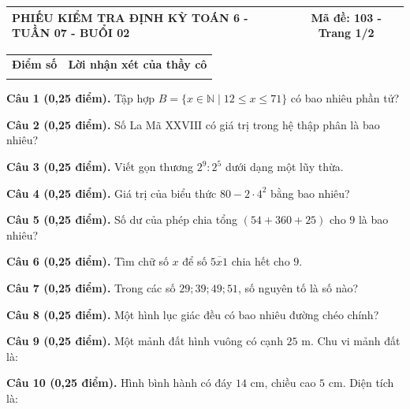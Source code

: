 \documentclass[12pt,a4paper]{article}
\begin{document}
\newpage
\noindent
\begin{tabularx}{\linewidth}{|X|c|}
\hline
\textbf{PHIẾU KIỂM TRA ĐỊNH KỲ TOÁN 6 - TUẦN 07 - BUỔI 02} & \textbf{Mã đề: 103 - Trang 1/2} \\
\hline
\end{tabularx}

\vspace{1.2mm}

\noindent
\begin{tabularx}{\linewidth}{|p{3.2cm}|X|}
\hline
\centering\textbf{Điểm số} & \centering\textbf{Lời nhận xét của thầy cô} \tabularnewline
\rule{0pt}{1.8cm} & \\
\hline
\end{tabularx}

\vspace{1.2mm}

\noindent\textbf{Câu 1 (0,25 điểm).} Tập hợp $B = \{x \in \mathbb{N} \mid 12 \le x \le 71\}$ có bao nhiêu phần tử? \par\vspace{0.3mm}
\noindent\textbf{Câu 2 (0,25 điểm).} Số La Mã $\text{XXVIII}$ có giá trị trong hệ thập phân là bao nhiêu? \par\vspace{0.3mm}
\noindent\textbf{Câu 3 (0,25 điểm).} Viết gọn thương $2^9 : 2^5$ dưới dạng một lũy thừa. \par\vspace{0.3mm}
\noindent\textbf{Câu 4 (0,25 điểm).} Giá trị của biểu thức $80 - 2 \cdot 4^2$ bằng bao nhiêu? \par\vspace{0.3mm}
\noindent\textbf{Câu 5 (0,25 điểm).} Số dư của phép chia tổng $(54 + 360 + 25)$ cho $9$ là bao nhiêu? \par\vspace{0.3mm}
\noindent\textbf{Câu 6 (0,25 điểm).} Tìm chữ số $x$ để số $\overline{5x1}$ chia hết cho $9$. \par\vspace{0.3mm}
\noindent\textbf{Câu 7 (0,25 điểm).} Trong các số $29; 39; 49; 51$, số nguyên tố là số nào? \par\vspace{0.3mm}
\noindent\textbf{Câu 8 (0,25 điểm).} Một hình lục giác đều có bao nhiêu đường chéo chính? \par\vspace{0.3mm}
\noindent\textbf{Câu 9 (0,25 điểm).} Một mảnh đất hình vuông có cạnh $25\text{ m}$. Chu vi mảnh đất là: \par\vspace{0.3mm}
\noindent\textbf{Câu 10 (0,25 điểm).} Hình bình hành có đáy $14\text{ cm}$, chiều cao $5\text{ cm}$. Diện tích là: \par\vspace{0.3mm}
\end{document}
